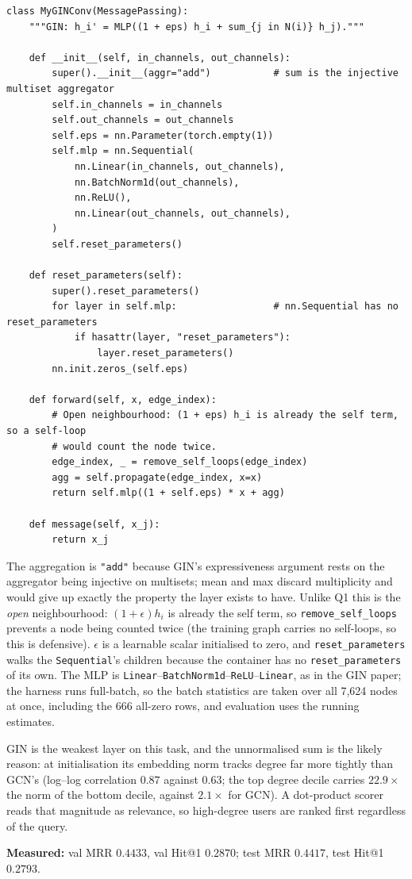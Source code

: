 \begin{lstlisting}[style=p1pystyle]
class MyGINConv(MessagePassing):
    """GIN: h_i' = MLP((1 + eps) h_i + sum_{j in N(i)} h_j)."""

    def __init__(self, in_channels, out_channels):
        super().__init__(aggr="add")           # sum is the injective multiset aggregator
        self.in_channels = in_channels
        self.out_channels = out_channels
        self.eps = nn.Parameter(torch.empty(1))
        self.mlp = nn.Sequential(
            nn.Linear(in_channels, out_channels),
            nn.BatchNorm1d(out_channels),
            nn.ReLU(),
            nn.Linear(out_channels, out_channels),
        )
        self.reset_parameters()

    def reset_parameters(self):
        super().reset_parameters()
        for layer in self.mlp:                 # nn.Sequential has no reset_parameters
            if hasattr(layer, "reset_parameters"):
                layer.reset_parameters()
        nn.init.zeros_(self.eps)

    def forward(self, x, edge_index):
        # Open neighbourhood: (1 + eps) h_i is already the self term, so a self-loop
        # would count the node twice.
        edge_index, _ = remove_self_loops(edge_index)
        agg = self.propagate(edge_index, x=x)
        return self.mlp((1 + self.eps) * x + agg)

    def message(self, x_j):
        return x_j
\end{lstlisting}

\noindent
The aggregation is \texttt{"add"} because GIN's expressiveness argument rests on the
aggregator being injective on multisets; mean and max discard multiplicity and would
give up exactly the property the layer exists to have. Unlike Q1 this is the
\emph{open} neighbourhood: $(1+\epsilon)h_i$ is already the self term, so
\texttt{remove\_self\_loops} prevents a node being counted twice (the training graph
carries no self-loops, so this is defensive). $\epsilon$ is a learnable scalar
initialised to zero, and \texttt{reset\_parameters} walks the \texttt{Sequential}'s
children because the container has no \texttt{reset\_parameters} of its own. The MLP
is \texttt{Linear}--\texttt{BatchNorm1d}--\texttt{ReLU}--\texttt{Linear}, as in the GIN
paper; the harness runs full-batch, so the batch statistics are taken over all 7{,}624
nodes at once, including the 666 all-zero rows, and evaluation uses the running
estimates.

GIN is the weakest layer on this task, and the unnormalised sum is the likely reason:
at initialisation its embedding norm tracks degree far more tightly than GCN's
(log--log correlation $0.87$ against $0.63$; the top degree decile carries
$22.9\times$ the norm of the bottom decile, against $2.1\times$ for GCN). A
dot-product scorer reads that magnitude as relevance, so high-degree users are ranked
first regardless of the query.

\medskip\noindent
\textbf{Measured:} val MRR $0.4433$, val Hit@1 $0.2870$; test MRR $0.4417$,
test Hit@1 $0.2793$.

